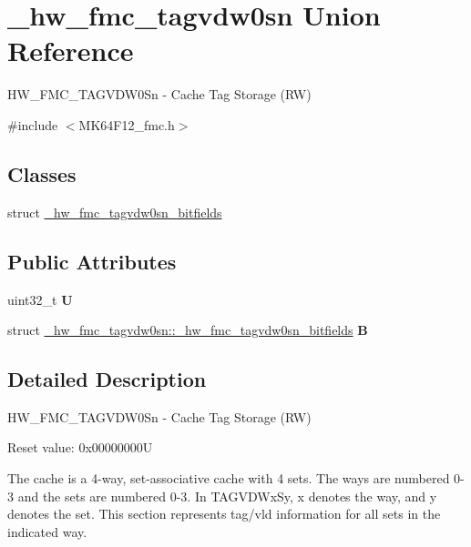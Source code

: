 \hypertarget{union__hw__fmc__tagvdw0sn}{}\section{\+\_\+hw\+\_\+fmc\+\_\+tagvdw0sn Union Reference}
\label{union__hw__fmc__tagvdw0sn}


H\+W\+\_\+\+F\+M\+C\+\_\+\+T\+A\+G\+V\+D\+W0\+Sn -\/ Cache Tag Storage (RW)  




{\ttfamily \#include $<$M\+K64\+F12\+\_\+fmc.\+h$>$}

\subsection*{Classes}
\begin{DoxyCompactItemize}
\item 
struct \hyperlink{struct__hw__fmc__tagvdw0sn_1_1__hw__fmc__tagvdw0sn__bitfields}{\+\_\+hw\+\_\+fmc\+\_\+tagvdw0sn\+\_\+bitfields}
\end{DoxyCompactItemize}
\subsection*{Public Attributes}
\begin{DoxyCompactItemize}
\item 
uint32\+\_\+t {\bfseries U}\hypertarget{union__hw__fmc__tagvdw0sn_a9f2c960da4da488f78a020f74447db76}{}\label{union__hw__fmc__tagvdw0sn_a9f2c960da4da488f78a020f74447db76}

\item 
struct \hyperlink{struct__hw__fmc__tagvdw0sn_1_1__hw__fmc__tagvdw0sn__bitfields}{\+\_\+hw\+\_\+fmc\+\_\+tagvdw0sn\+::\+\_\+hw\+\_\+fmc\+\_\+tagvdw0sn\+\_\+bitfields} {\bfseries B}\hypertarget{union__hw__fmc__tagvdw0sn_aaca2fb56ea28754ca7992843d4d415f7}{}\label{union__hw__fmc__tagvdw0sn_aaca2fb56ea28754ca7992843d4d415f7}

\end{DoxyCompactItemize}


\subsection{Detailed Description}
H\+W\+\_\+\+F\+M\+C\+\_\+\+T\+A\+G\+V\+D\+W0\+Sn -\/ Cache Tag Storage (RW) 

Reset value\+: 0x00000000U

The cache is a 4-\/way, set-\/associative cache with 4 sets. The ways are numbered 0-\/3 and the sets are numbered 0-\/3. In T\+A\+G\+V\+D\+Wx\+Sy, x denotes the way, and y denotes the set. This section represents tag/vld information for all sets in the indicated way. 

